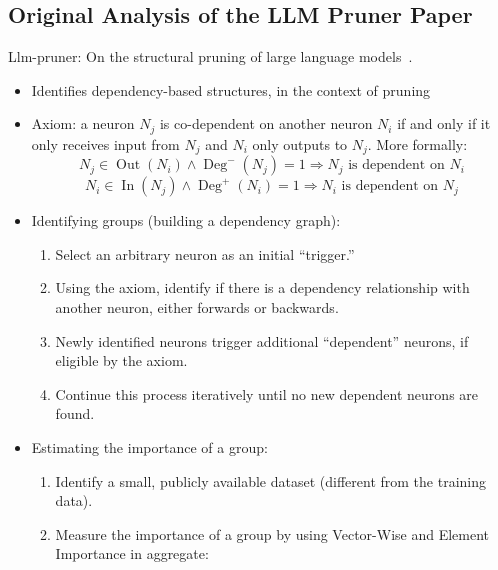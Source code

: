 \documentclass{article}
\begin{document}
    \subsection{Original Analysis of the LLM Pruner Paper}\label{subsec:original-analysis-of-the-llm-pruner-paper}
    Llm-pruner: On the structural pruning of large language models~\cite{ma2023llm}.
    \begin{itemize}
        \item Identifies dependency-based structures, in the context of pruning
        \item Axiom: a neuron $N_j$ is co-dependent on another neuron $N_i$ if and only if it only receives input from $N_j$ and $N_i$ only outputs to $N_j$.
        More formally:
        \begin{equation}
            N_j \in \operatorname{Out}(N_i) \wedge \operatorname{Deg}^-(N_j) = 1 \Rightarrow N_j \text{ is dependent on } N_i\label{eq:equation}
        \end{equation}
        \begin{equation}
            N_i \in \operatorname{In}(N_j) \wedge \operatorname{Deg}^+(N_i) = 1 \Rightarrow N_i \text{ is dependent on } N_j\label{eq:equation2}
        \end{equation}
        \item Identifying groups (building a dependency graph):
        \begin{enumerate}
            \item Select an arbitrary neuron as an initial ``trigger.''
            \item Using the axiom, identify if there is a dependency relationship with another neuron, either forwards or backwards.
            \item Newly identified neurons trigger additional ``dependent'' neurons, if eligible by the axiom.
            \item Continue this process iteratively until no new dependent neurons are found.
        \end{enumerate}
        \item Estimating the importance of a group:
        \begin{enumerate}
            \item Identify a small, publicly available dataset (different from the training data).
            \item Measure the importance of a group by using Vector-Wise and Element Importance in aggregate:
            \begin{enumerate}

\end{enumerate}
\end{enumerate}
\end{itemize}
\end{document}
